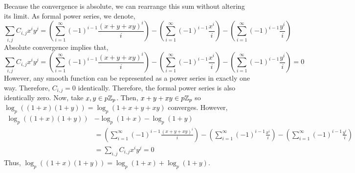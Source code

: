 \documentclass[12pt]{extarticle}
\begin{document}
\begin{enumerate}
\begin{enumerate}
Because the convergence is absolute, we can rearrange this sum without altering its limit.
As formal power series, we denote,
\[ \sum_{i,j} C_{i,j} x^i y^j = \left(\sum_{i = 1}^\infty (-1)^{i - 1} \frac{(x + y + xy)^i}{i}\right) - \left(\sum_{i = 1}^\infty (-1)^{i - 1} \frac{x^i}{i}\right) - \left(\sum_{i = 1}^\infty (-1)^{i - 1} \frac{y^i}{i}\right)\]
Absolute convergence implies that,
\[ \sum_{i,j} C_{i,j} x^i y^j =  \left(\sum_{i = 1}^\infty (-1)^{i - 1} \frac{(x + y + xy)^i}{i}\right) - \left(\sum_{i = 1}^\infty (-1)^{i - 1} \frac{x^i}{i}\right) - \left(\sum_{i = 1}^\infty (-1)^{i - 1} \frac{y^i}{i}\right) = 0\]
However, any smooth function can be represented as a power series in exactly one way. Therefore, $C_{i, j} = 0$ identically. Therefore, the formal power series is also identically zero. Now, take $x,y \in p \mathbb{Z}_p$. Then, $x + y + xy \in p \mathbb{Z}_p$ so $\log_p((1 + x)(1 + y)) = \log_p(1 + x + y + xy)$ converges. However, 
\begin{align*}
\log_p((1 + x)(1 + y)) & - \log_p(1 + x) - \log_p(1 + y) \\ 
& = \left(\sum_{i = 1}^\infty (-1)^{i - 1} \frac{(x + y + xy)^i}{i}\right) - \left(\sum_{i = 1}^\infty (-1)^{i - 1} \frac{x^i}{i}\right) - \left(\sum_{i = 1}^\infty (-1)^{i - 1} \frac{y^i}{i}\right) \\ & = \sum_{i,j} C_{i,j} x^i y^j = 0
\end{align*}   
Thus, $\log_p((1 + x)(1 + y)) = \log_p(1 + x) + \log_p(1 + y)$.


\end{enumerate}
\end{enumerate}
\end{document}
